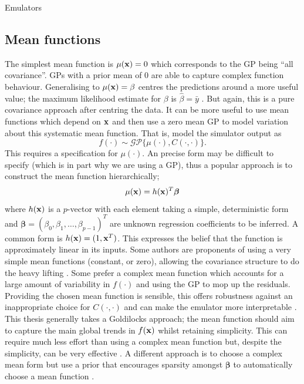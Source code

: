 \begin{chapter}{Emulators \label{Ch:Emulators}}
\subsection{Mean functions}
The simplest mean function is $\mu(\mathbf{x}) = 0$ which corresponds to the GP being ``all covariance''. GPs with a prior mean of $0$ are able to capture complex function behaviour. Generalising to $\mu(\mathbf{x}) = \beta$ centres the predictions around a more useful value; the maximum likelihood estimate for $\beta$ is $\hat{\beta} = \bar{y}$ \citep{Sacks89}. But again, this is a pure covariance approach after centring the data. It can be more useful to use mean functions which depend on $\mathbf{x}$ and then use a zero mean GP to model variation about this systematic mean function. That is, model the simulator output as
\begin{equation}
  f(\cdot) \sim \mathcal{GP}\{\mu(\cdot), C(\cdot, \cdot)\}.
\end{equation}
This requires a specification for $\mu(\cdot)$. An precise form may be difficult to specify (which is in part why we are using a GP), thus a popular approach is to construct the mean function hierarchically;
\begin{equation}
  \mu(\mathbf{x}) = h(\mathbf{x})^T \bm{\beta}
\end{equation}
where $h(\mathbf{x})$ is a $p$-vector with each element taking a simple, deterministic form and $\bm{\beta} = (\beta_0, \beta_1, \ldots, \beta_{p-1})^T$ are unknown regression coefficients to be inferred. A common form is $h(\mathbf{x}) = (1, \mathbf{x}^T)$. This expresses the belief that the function is approximately linear in its inputs. Some authors are proponents of using a very simple mean functions (constant, or zero), allowing the covariance structure to do the heavy lifting \citep{Henderson09,Zhang2019}. Some prefer a complex mean function which accounts for a large amount of variability in $f(\cdot)$ and using the GP to mop up the residuals. Providing the chosen mean function is sensible, this offers robustness against an inappropriate choice for $C(\cdot, \cdot)$ and can make the emulator more interpretable \citep{Xu16,Vernon2010}. This thesis generally takes a Goldilocks approach; the mean function should aim to capture the main global trends in $f(\mathbf{x})$ whilst retaining simplicity. This can require much less effort than using a complex mean function but, despite the simplicity, can be very effective \citep{Ohagan01, Fricker2013, Fisher2021}. A different approach is to choose a complex mean form but use a prior that encourages sparsity amongst $\bm{\beta}$ to automatically choose a mean function \citep{Seshadri2020}.


\end{chapter}
